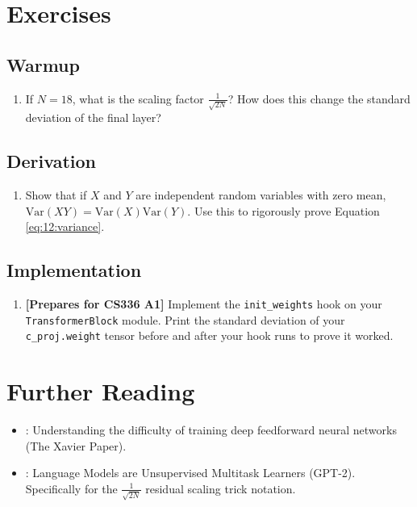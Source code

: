 \section{Exercises}
\label{ch:12:sec:exercises}

\subsection*{Warmup}
\begin{enumerate}
  \item If $N=18$, what is the scaling factor $\frac{1}{\sqrt{2N}}$? How does this change the standard deviation of the final layer?
\end{enumerate}

\subsection*{Derivation}
\begin{enumerate}
  \item Show that if $X$ and $Y$ are independent random variables with zero mean, $\text{Var}(XY) = \text{Var}(X)\text{Var}(Y)$. Use this to rigorously prove Equation \cref{eq:12:variance}.
\end{enumerate}

\subsection*{Implementation}
\begin{enumerate}
  \item \textbf{[Prepares for CS336 A1]} Implement the \texttt{init\_weights} hook on your \texttt{TransformerBlock} module. Print the standard deviation of your \texttt{c\_proj.weight} tensor before and after your hook runs to prove it worked.
\end{enumerate}

\section{Further Reading}
\label{ch:12:sec:further}

\begin{itemize}
  \item \textcite{glorot2010}: Understanding the difficulty of training deep feedforward neural networks (The Xavier Paper).
  \item \textcite{radford2019}: Language Models are Unsupervised Multitask Learners (GPT-2). Specifically for the $\frac{1}{\sqrt{2N}}$ residual scaling trick notation.
\end{itemize}
